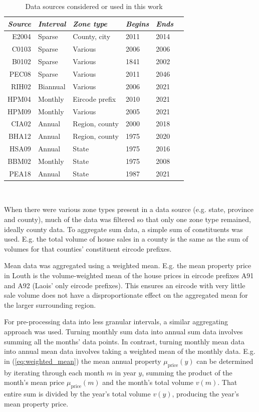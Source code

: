 \documentclass[twocolumn]{article}
\begin{document}
\begin{table}[h!]
\centering
\begin{tabularx}{0.5\textwidth}{r X X X X X}
    \textit{Source} & \textit{Interval} & \textit{Zone type} & \textit{Begins} & \textit{Ends} \\ \hline
    E2004 & Sparse & County, city & 2011 & 2014 \\ \hline
    C0103 & Sparse & Various & 2006 & 2006 \\ \hline
    B0102 & Sparse & Various & 1841 & 2002 \\ \hline
    PEC08 & Sparse & Various & 2011 & 2046 \\ \hline
    RIH02 & Biannual & Various & 2006 & 2021 \\ \hline
    HPM04 & Monthly & Eircode prefix & 2010 & 2021 \\ \hline
    HPM09 & Monthly & Various & 2005 & 2021 \\ \hline
    CIA02 & Annual & Region, county & 2000 & 2018 \\ \hline
    BHA12 & Annual & Region, county & 1975 & 2020 \\ \hline
    HSA09 & Annual & State & 1975 & 2016 \\ \hline
    BBM02 & Monthly & State & 1975 & 2008 \\ \hline
    PEA18 & Annual & State & 1987 & 2021
\end{tabularx} \\
\caption{Data sources considered or used in this work}
\label{tab:sources}
\end{table}

When there were various zone types present in a data source (e.g. state, province
and county), much of the data was filtered so that only one zone type remained,
ideally county data.  To aggregate sum data, a simple sum of constituents was used.
E.g. the total volume of house sales in a county is the same as the sum of volumes
for that counties' constituent eircode prefixes.

Mean data was aggregated using a weighted mean.  E.g. the mean property price in
Louth is the volume-weighted mean of the house prices in eircode prefixes
A91 and A92 (Laois' only eircode prefixes).  This ensures an eircode with very little
sale volume does not have a disproportionate effect on the aggregated mean for the
larger surrounding region.

For pre-processing data into less granular intervals, a similar aggregating approach
was used.  Turning monthly sum data into annual sum data involves summing all the months'
data points.  In contrast, turning monthly mean data into annual mean data involves taking a weighted
mean of the monthly data.  E.g. in (\ref{eq:weighted_mean}) the mean annual property
$\mu_{\text{price}}(y)$ can be determined by iterating through each month $m$ in
year $y$, summing the product of the month's mean price $\mu_{\text{price}}(m)$ and the month's total volume
$v(m)$.  That entire sum is divided by the year's total volume $v(y)$, producing the
year's mean property price.
\end{document}
